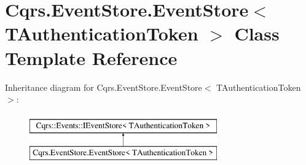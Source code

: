 \hypertarget{classCqrs_1_1EventStore_1_1EventStore}{}\section{Cqrs.\+Event\+Store.\+Event\+Store$<$ T\+Authentication\+Token $>$ Class Template Reference}
\label{classCqrs_1_1EventStore_1_1EventStore}
Inheritance diagram for Cqrs.\+Event\+Store.\+Event\+Store$<$ T\+Authentication\+Token $>$\+:\begin{figure}[H]
\begin{center}
\leavevmode
\includegraphics[height=2.000000cm]{classCqrs_1_1EventStore_1_1EventStore}
\end{center}
\end{figure}
